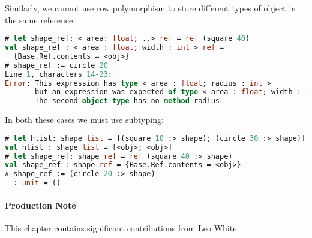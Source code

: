 Similarly, we cannot use row polymorphism to store different types of
object in the same reference:

\begin{lstlisting}[language=Caml]
# let shape_ref: < area: float; ..> ref = ref (square 40)
val shape_ref : < area : float; width : int > ref =
  {Base.Ref.contents = <obj>}
# shape_ref := circle 20
Line 1, characters 14-23:
Error: This expression has type < area : float; radius : int >
       but an expression was expected of type < area : float; width : int >
       The second object type has no method radius
\end{lstlisting}

In both these cases we must use subtyping:~

\begin{lstlisting}[language=Caml]
# let hlist: shape list = [(square 10 :> shape); (circle 30 :> shape)]
val hlist : shape list = [<obj>; <obj>]
# let shape_ref: shape ref = ref (square 40 :> shape)
val shape_ref : shape ref = {Base.Ref.contents = <obj>}
# shape_ref := (circle 20 :> shape)
- : unit = ()
\end{lstlisting}

\hypertarget{production-note}{%
\paragraph{Production Note}\label{production-note}}

This chapter contains significant contributions from Leo White.
